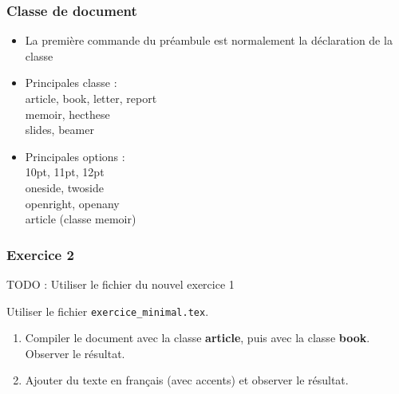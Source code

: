 
\begin{frame}[fragile]

	\frametitle{Classe de document}
	
	\begin{itemize}
		\item La première commande du préambule est normalement la déclaration de la classe
	\begin{codesource}
	\documentclass[options]{classe}
	\end{codesource}
				
		\pause
		
		\item Principales classe : \\
			article, book, letter, report \\
			memoir, hecthese \\
			slides, beamer
		
		\pause
		
		\item Principales options : \\
			10pt, 11pt, 12pt \\
			oneside, twoside \\
			openright, openany \\
			article (classe memoir)
	\end{itemize}
\end{frame}


\begin{frame}[c]

\frametitle{Exercice 2}

TODO : Utiliser le fichier du nouvel exercice 1

Utiliser le fichier \texttt{exercice\_minimal.tex}.

\begin{enumerate}
	\item Compiler le document avec la classe \textbf{article}, puis avec la classe
	\textbf{book}. Observer le résultat.
	
	\item Ajouter du texte en français (avec accents) et observer le résultat.
\end{enumerate}
\end{frame}


